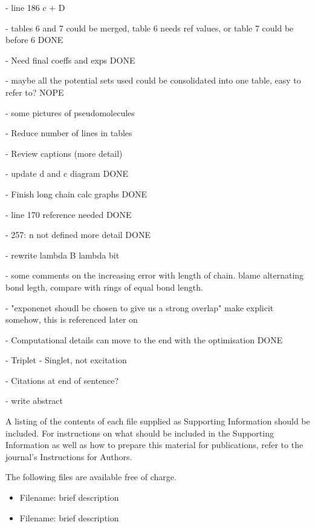 \documentclass[journal=jctcce,manuscript=article]{achemso}
\begin{document}
- line 186 c + D

- tables 6 and 7 could be merged, table 6 needs ref values, or table 7 could be before 6 DONE

- Need final coeffs and exps DONE

- maybe all the potential sets used could be consolidated into one table, easy to refer to? NOPE

- some pictures of pseudomolecules

- Reduce number of lines in tables

- Review captions (more detail)

- update d and c diagram DONE

- Finish long chain calc graphs DONE

- line 170 reference needed DONE

- 257: n not defined more detail DONE

- rewrite lambda B lambda bit

- some comments on the increasing error with length of chain. blame alternating bond legth, compare with rings of equal bond length. 

- "exponenet shoudl be chosen to give us a strong overlap" make explicit somehow, this is referenced later on

- Computational details can move to the end with the optimisation DONE

- Triplet - Singlet, not excitation

- Citations at end of sentence? 

- write abstract


\begin{suppinfo}

A listing of the contents of each file supplied as Supporting Information
should be included. For instructions on what should be included in the
Supporting Information as well as how to prepare this material for
publications, refer to the journal's Instructions for Authors.

The following files are available free of charge.
\begin{itemize}
  \item Filename: brief description
  \item Filename: brief description
\end{itemize}

\end{suppinfo}


\end{document}
